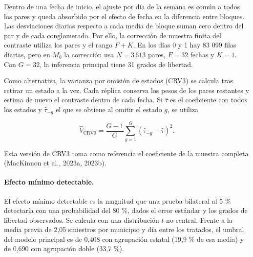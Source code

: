 \documentclass[11pt,letterpaper]{article}
\begin{document}
Dentro de una fecha de inicio, el ajuste por día de la semana es común a todos los pares y queda absorbido por el efecto de fecha en la diferencia entre bloques. Las desviaciones diarias respecto a cada media de bloque suman cero dentro del par y de cada conglomerado. Por ello, la corrección de muestra finita del contraste utiliza los pares y el rango $F+K$. En los días 0 y 1 hay 83 099 filas diarias, pero en $M_0$ la corrección usa $N=3\,613$ pares, $F=32$ fechas y $K=1$. Con $G=32$, la inferencia principal tiene 31 grados de libertad.\par

Como alternativa, la varianza por omisión de estados (CRV3) se calcula tras retirar un estado a la vez. Cada réplica conserva los pesos de los pares restantes y estima de nuevo el contraste dentro de cada fecha. Si $\hat\tau$ es el coeficiente con todos los estados y $\hat\tau_{-g}$ el que se obtiene al omitir el estado $g$, se utiliza\par

\[
\widehat V_{\mathrm{CRV3}}=\frac{G-1}{G}\sum_{g=1}^{G}(\hat\tau_{-g}-\hat\tau)^2.
\]

Esta versión de CRV3 toma como referencia el coeficiente de la muestra completa (MacKinnon et al., 2023a, 2023b).\par

\paragraph{Efecto mínimo detectable.}

El efecto mínimo detectable es la magnitud que una prueba bilateral al 5 \% detectaría con una probabilidad del 80 \%, dados el error estándar y los grados de libertad observados. Se calcula con una distribución $t$ no central. Frente a la media previa de 2,05 siniestros por municipio y día entre los tratados, el umbral del modelo principal es de 0,408 con agrupación estatal (19,9 \% de esa media) y de 0,690 con agrupación doble (33,7 \%).\par
\end{document}
